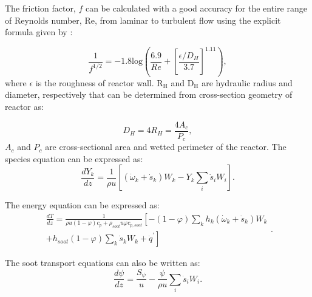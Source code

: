 The friction factor, $f$ can be calculated with a good accuracy for the entire range of Reynolds number, Re, from laminar to turbulent flow using the explicit formula given by \citet{haaland1983simple}:

\begin{equation}
	\frac{1}{f^{1/2}} = -1.8 \mathrm{log}
	\left(
		\frac{6.9}{Re}+
		\left[ \frac{\epsilon/D_H}{3.7} \right]^{1.11}
	\right)
	\label{eqn:fpfr},
\end{equation}
\noindent where $\epsilon$ is the roughness of reactor wall.
$\mathrm{R_H}$ and $\mathrm{D_H}$ are hydraulic radius and diameter, respectively that can be determined from cross-section geometry of reactor as:

\begin{equation}
	D_H = 4 R_H = \frac{4 A_c}{P_c}
	\label{eqn:RDHpfr},
\end{equation}
\noindent $A_c$ and $P_c$ are cross-sectional area and wetted perimeter of the reactor.
The species equation can be expressed as:
\begin{equation}
	\frac{d Y_k}{d z}=\frac{1}{\rho u}\left[\left(\dot{\omega}_k+\dot{s}_k\right) W_k-Y_k \sum_i \dot{s}_i W_i\right]
	\label{eqn:speciespfr}.
\end{equation}

The energy equation can be expressed as:
\begin{equation}
	\begin{split}
		\frac{d T}{d z}=
		\frac{1}{\rho u (1-\varphi) c_p+\rho_{soot} u \varphi 	c_{p,soot}}
		\left[
			-(1-\varphi)\sum_k h_k
			\left(
			\dot{\omega}_k+\dot{s}_k
			\right) W_k
		\right. \\
		\left.
			+h_{soot}(1-\varphi)\sum_k \dot{s}_k W_k
			+\dot{q}^\prime
		\right]
	\end{split}
	\label{eqn:energypfr}.
\end{equation}

The soot transport equations can also be written as:
\begin{equation}
	\frac{d \psi}{d z}=
	\frac{S_{\psi}}{u}
	-\frac{\psi}{\rho u}\sum_i \dot{s}_i W_i
	\label{eqn:sootpfr}.
\end{equation}


